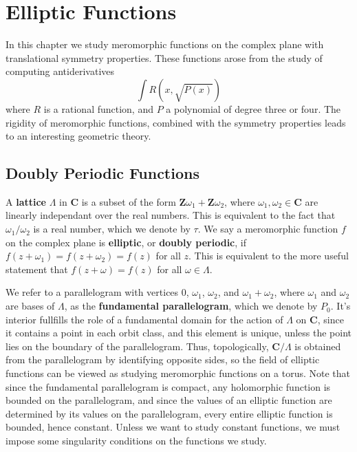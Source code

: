 \chapter{Elliptic Functions}

In this chapter we study meromorphic functions on the complex plane with translational symmetry properties. These functions arose from the study of computing antiderivatives
%
\[ \int R(x,\sqrt{P(x)}) \]
%
where $R$ is a rational function, and $P$ a polynomial of degree three or four. The rigidity of meromorphic functions, combined with the symmetry properties leads to an interesting geometric theory.

\section{Doubly Periodic Functions}

A {\bf lattice} $\Lambda$ in $\mathbf{C}$ is a subset of the form $\mathbf{Z} \omega_1 + \mathbf{Z} \omega_2$, where $\omega_1, \omega_2 \in \mathbf{C}$ are linearly independant over the real numbers. This is equivalent to the fact that $\omega_1/\omega_2$ is a real number, which we denote by $\tau$. We say a meromorphic function $f$ on the complex plane is {\bf elliptic}, or {\bf doubly periodic}, if $f(z + \omega_1) = f(z + \omega_2) = f(z)$ for all $z$. This is equivalent to the more useful statement that $f(z + \omega) = f(z)$ for all $\omega \in \Lambda$.

We refer to a parallelogram with vertices $0$, $\omega_1$, $\omega_2$, and $\omega_1 + \omega_2$, where $\omega_1$ and $\omega_2$ are bases of $\Lambda$, as the {\bf fundamental parallelogram}, which we denote by $P_0$. It's interior fullfills the role of a fundamental domain for the action of $\Lambda$ on $\mathbf{C}$, since it contains a point in each orbit class, and this element is unique, unless the point lies on the boundary of the parallelogram. Thus, topologically, $\mathbf{C}/\Lambda$ is obtained from the parallelogram by identifying opposite sides, so the field of elliptic functions can be viewed as studying meromorphic functions on a torus. Note that since the fundamental parallelogram is compact, any holomorphic function is bounded on the parallelogram, and since the values of an elliptic function are determined by its values on the parallelogram, every entire elliptic function is bounded, hence constant. Unless we want to study constant functions, we must impose some singularity conditions on the functions we study.

